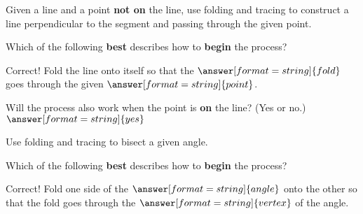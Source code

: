 \documentclass[nooutcomes]{ximera}
\begin{document}
\begin{problem}
Given a line and a point \textbf{not on} the line, use folding and tracing to construct a line perpendicular to the segment and passing through the given point. 
\begin{image}
\end{image}
Which of the following \textbf{best} describes how to \textbf{begin} the process?  
\begin{multipleChoice}
\end{multipleChoice}
\begin{problem}
Correct!  Fold the line onto itself so that the $\answer[format=string]{fold}$ goes through the given $\answer[format=string]{point}$.

Will the process also work when the point is \textbf{on} the line?  (Yes or no.) $\answer[format=string]{yes}$
\end{problem}
\end{problem}


\begin{problem}
Use folding and tracing to bisect a given angle.
\begin{image}
\end{image}

Which of the following \textbf{best} describes how to \textbf{begin} the process?  
\begin{multipleChoice}
\end{multipleChoice}
\begin{problem}
Correct!  Fold one side of the $\answer[format=string]{angle}$ onto the other so that the fold goes through the $\answer[format=string]{vertex}$ of the angle. 
\end{problem}
\end{problem}
\end{document}
